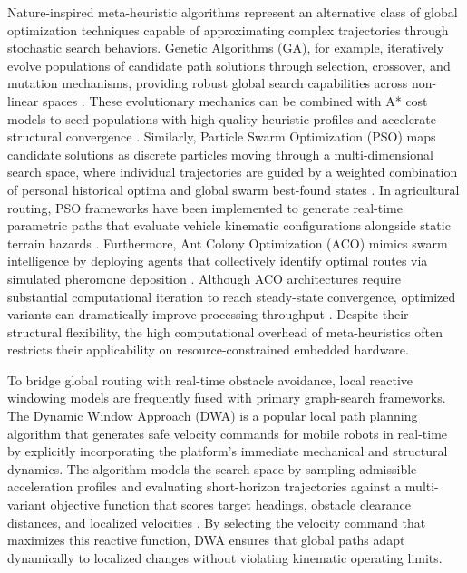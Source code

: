 Nature-inspired meta-heuristic algorithms represent an alternative class of global optimization
techniques capable of approximating complex trajectories through stochastic search behaviors.
Genetic Algorithms (GA), for example, iteratively evolve populations of candidate path solutions
through selection, crossover, and mutation mechanisms, providing robust global search capabilities
across non-linear spaces \citep{Zhang_2018_pathplanning, Zhao_2018_surveycomputationalintelligencebased}. These evolutionary mechanics can be combined with
A* cost models to seed populations with high-quality heuristic profiles and accelerate structural
convergence \citep{Li_2020_mobilerobot}. Similarly, Particle Swarm Optimization (PSO) maps candidate solutions as
discrete particles moving through a multi-dimensional search space, where individual trajectories
are guided by a weighted combination of personal historical optima and global swarm best-found
states \citep{Zafar_2018_methodologypath}. In agricultural routing, PSO frameworks have been implemented to generate
real-time parametric paths that evaluate vehicle kinematic configurations alongside static terrain
hazards \citep{Xu_2022_realtimeparametric}. Furthermore, Ant Colony Optimization (ACO) mimics swarm intelligence by
deploying agents that collectively identify optimal routes via simulated pheromone deposition
\citep{Saeed_2022_optimalpath, Luo_2020_researchpath}. Although ACO architectures require substantial computational iteration to
reach steady-state convergence, optimized variants can dramatically improve processing throughput
\citep{Saeed_2022_optimalpath}. Despite their structural flexibility, the high computational overhead of
meta-heuristics often restricts their applicability on resource-constrained embedded hardware.

To bridge global routing with real-time obstacle avoidance, local reactive windowing models are
frequently fused with primary graph-search frameworks. The Dynamic Window Approach (DWA) is a
popular local path planning algorithm that generates safe velocity commands for mobile robots in
real-time by explicitly incorporating the platform's immediate mechanical and structural dynamics.
The algorithm models the search space by sampling admissible acceleration profiles and evaluating
short-horizon trajectories against a multi-variant objective function that scores target headings,
obstacle clearance distances, and localized velocities \citep{Liu_2023_mobilerobot, Li_2020_pathplanning, Liao_2023_researchpath}. By selecting
the velocity command that maximizes this reactive function, DWA ensures that global paths adapt
dynamically to localized changes without violating kinematic operating limits.

